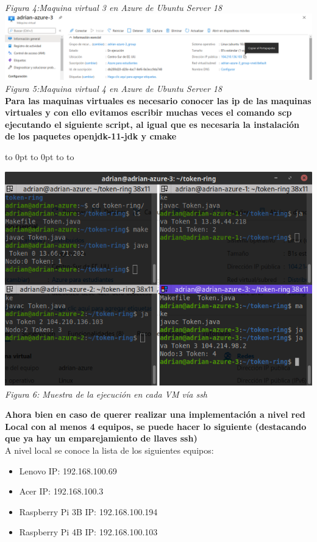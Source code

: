 \documentclass[10pt,executivepaper]{article}
\def\fillandplacepagenumber{%
 \par\pagestyle{empty}%
 \vbox to 0pt{\vss}\vfill
 \vbox to 0pt{\baselineskip0pt
   \hbox to\linewidth{\hss}%
   \baselineskip\footskip
   \hbox to\linewidth{%
     \hfil\thepage\hfil}\vss}}
\begin{document}
\begin{center}
\begin{landscape}
    \\\textit{Figura 4:Maquina virtual 3 en Azure de Ubuntu Server 18}\\
    \includegraphics[scale=0.5]{img/vm-4.png}
    \\\textit{Figura 5:Maquina virtual 4 en Azure de Ubuntu Server 18}\\
    \textbf{Para las maquinas virtuales es necesario conocer las ip de las maquinas virtuales y con ello evitamos escribir muchas veces el comando scp ejecutando el siguiente script, al igual que es necesaria la instalación de los paquetes openjdk-11-jdk y cmake}
    \fillandplacepagenumber
  \end{landscape}
  
  \includegraphics[scale=0.5]{img/token-azure.png}
  \\\textit{Figura 6: Muestra de la ejecución en cada VM vía ssh}\\

\end{center}
\textbf{Ahora bien en caso de querer realizar una implementación a nivel red Local con al menos 4 equipos, se puede hacer lo siguiente (destacando que ya hay un emparejamiento de llaves ssh)}\\
A nivel local se conoce la lista de los siguientes equipos:
\begin{itemize}
  \item Lenovo IP: 192.168.100.69
  \item Acer IP: 192.168.100.3
  \item Raspberry Pi 3B IP: 192.168.100.194
  \item Raspberry Pi 4B IP: 192.168.100.103
\end{itemize}
\end{document}
